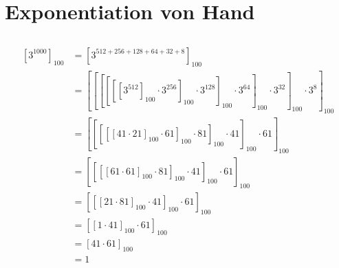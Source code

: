 \documentclass{../crypto}
\date{11. Dezember 2015}
\begin{document}
\maketitle

\section{Exponentiation von Hand}

\subsection{}
\begin{align*}
  \left[3^{1000}\right]_{100} &= \left[3^{512+256+128+64+32+8}\right]_{100} \\
                              &= \left[\left[\left[\left[\left[\left[3^{512}\right]_{100} 
                              \cdot 3^{256}\right]_{100}
                              \cdot 3^{128}\right]_{100}
                              \cdot 3^{64}\right]_{100}
                              \cdot 3^{32}\right]_{100}
                              \cdot 3^{8}\right]_{100} \\
                              &= \left[\left[\left[\left[\left[41 \cdot 21\right]_{100}
                              \cdot 61\right]_{100}
                              \cdot 81\right]_{100}
                              \cdot 41\right]_{100}
                              \cdot 61\right]_{100} \\
                              &= \left[\left[\left[\left[61 \cdot 61\right]_{100}
                              \cdot 81\right]_{100}
                              \cdot 41\right]_{100}
                              \cdot 61\right]_{100} \\
                              &= \left[\left[\left[21 \cdot 81\right]_{100}
                              \cdot 41\right]_{100}
                              \cdot 61\right]_{100} \\
                              &= \left[\left[1 \cdot 41\right]_{100}
                              \cdot 61\right]_{100} \\
                              &= \left[41 \cdot 61\right]_{100} \\
                              &= 1
\end{align*}
\end{document}
